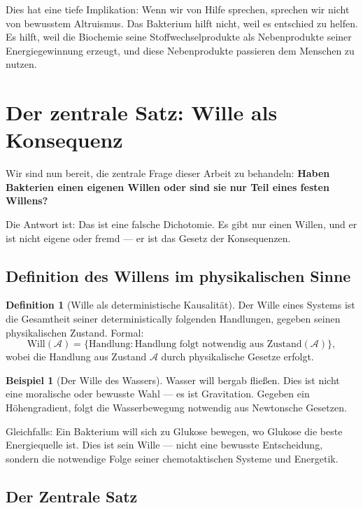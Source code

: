 \documentclass[a4paper,12pt]{article}
\theoremstyle{definition}
\newtheorem{definition}{Definition}
\newtheorem{beispiel}{Beispiel}
\begin{document}
Dies hat eine tiefe Implikation: Wenn wir von Hilfe sprechen, sprechen wir nicht von bewusstem Altruismus. Das Bakterium hilft nicht, weil es entschied zu helfen. Es hilft, weil die Biochemie seine Stoffwechselprodukte als Nebenprodukte seiner Energiegewinnung erzeugt, und diese Nebenprodukte passieren dem Menschen zu nutzen.

\section{Der zentrale Satz: Wille als Konsequenz}

Wir sind nun bereit, die zentrale Frage dieser Arbeit zu behandeln: \textbf{Haben Bakterien einen eigenen Willen oder sind sie nur Teil eines festen Willens?}

Die Antwort ist: Das ist eine falsche Dichotomie. Es gibt nur einen Willen, und er ist nicht eigene oder fremd --- er ist das Gesetz der Konsequenzen.

\subsection{Definition des Willens im physikalischen Sinne}

\begin{definition}[Wille als deterministische Kausalität]
Der Wille eines Systems ist die Gesamtheit seiner deterministically folgenden Handlungen, gegeben seinen physikalischen Zustand. Formal:
\[
\text{Will}(\mathcal{A}) = \{\text{Handlung} : \text{Handlung folgt notwendig aus } \text{Zustand}(\mathcal{A})\},
\]
wobei die Handlung aus Zustand $\mathcal{A}$ durch physikalische Gesetze erfolgt.
\end{definition}

\begin{beispiel}[Der Wille des Wassers]
Wasser will bergab fließen. Dies ist nicht eine moralische oder bewusste Wahl --- es ist Gravitation. Gegeben ein Höhengradient, folgt die Wasserbewegung notwendig aus Newtonsche Gesetzen.

Gleichfalls: Ein Bakterium will sich zu Glukose bewegen, wo Glukose die beste Energiequelle ist. Dies ist sein Wille --- nicht eine bewusste Entscheidung, sondern die notwendige Folge seiner chemotaktischen Systeme und Energetik.
\end{beispiel}

\subsection{Der Zentrale Satz}
\end{document}
